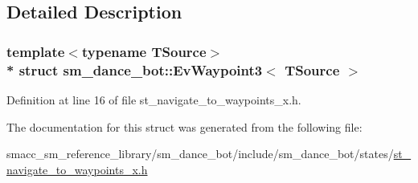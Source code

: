 \subsection{Detailed Description}
\subsubsection*{template$<$typename T\+Source$>$\\*
struct sm\+\_\+dance\+\_\+bot\+::\+Ev\+Waypoint3$<$ T\+Source $>$}



Definition at line 16 of file st\+\_\+navigate\+\_\+to\+\_\+waypoints\+\_\+x.\+h.



The documentation for this struct was generated from the following file\+:\begin{DoxyCompactItemize}
\item 
smacc\+\_\+sm\+\_\+reference\+\_\+library/sm\+\_\+dance\+\_\+bot/include/sm\+\_\+dance\+\_\+bot/states/\hyperlink{st__navigate__to__waypoints__x_8h}{st\+\_\+navigate\+\_\+to\+\_\+waypoints\+\_\+x.\+h}\end{DoxyCompactItemize}
